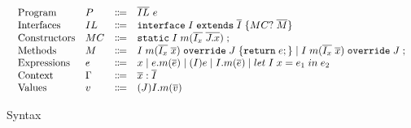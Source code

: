 \begin{figure*}
	\saveSpaceFig
	\begin{displaymath}
		\begin{array}{l}
			\begin{array}{llrl}
				\text{Program}		& P & \Coloneqq  & \overline{IL} \ e \\
				\text{Interfaces}   & IL & \Coloneqq & \texttt{interface} \; I \; \texttt{extends} \; \overline{I} \; {\{} MC? \; \overline{M} {\}} \\
				\text{Constructors} & MC & \Coloneqq & \texttt{static} \; I \; m (\overline{I_x} \; \overline{J.x}) \; ; \\
				\text{Methods}      & M  & \Coloneqq & I \; m (\overline{I_x} \; \overline{x}) \; \texttt{override} \; J \; {\{} \texttt{return} \; e ; {\}}  \mid
				I \; m (\overline{I_x} \; \overline{x}) \; \texttt{override} \; J \; ; \\
				\text{Expressions}  & e  & \Coloneqq & 
				x \mid
				e.m(\overline{e}) \mid
				(I)e \mid 
				I.m(\overline{e}) \mid 
				let \; I \; x = e_1 \; in \; e_2   \\
				\text{Context}      & \Gamma & \Coloneqq & \overline{x}:\overline{I} \\
				\text{Values}       & v & \Coloneqq & (J) I.m(\overline{v}) \\
			\end{array}
		\end{array}
	\end{displaymath}
	\caption{Syntax}\label{fig:syntax}
	\saveSpaceFig
\end{figure*}

%		
	
